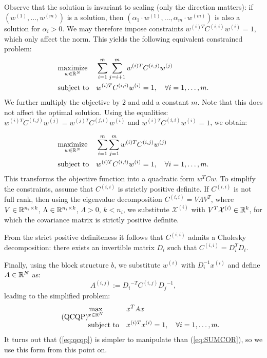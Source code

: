 Observe that the solution is invariant to scaling (only the direction matters):
if $\left(w^{(1)}, \ldots, w^{(m)}\right)$ is a solution, then
$\left(\alpha_1 \cdot w^{(1)}, \ldots, \alpha_m \cdot w^{(m)}\right)$ is also a
solution for $\alpha_i > 0$. We may therefore impose constraints $w^{(i)T}C^{(i,i)}w^{(i)} = 1$,
which only affect the norm. This yields the following  equivalent constrained problem:
\begin{equation}\label{eq:qcqp0}
\begin{aligned}
& \underset{w \in \mathbb{R}^N}{\text{maximize}}
& & \sum_{i = 1}^m \sum_{j = i+1}^m w^{(i)T} C^{(i,j)} w^{(j)}\\
& \text{subject to}
& &w^{(i)T} C^{(i,i)} w^{(i)} = 1, \quad\forall i = 1,\ldots, m.
\end{aligned}
\end{equation}
We further multiply the objective by $2$ and add a constant $m$. Note that this does not
affect the optimal solution. Using the equalities: $w^{(i)T} C^{(i,j)} w^{(j)} = w^{(j)T} C^{(j,i)} w^{(i)}$
and $w^{(i)T} C^{(i,i)} w^{(i)} = 1$, we obtain:

\begin{equation}\label{eq:qcqp05}
\begin{aligned}
& \underset{w \in \mathbb{R}^N}{\text{maximize}}
& & \sum_{i = 1}^m \sum_{j = 1}^m w^{(i)T} C^{(i,j)} w^{(j)}\\
& \text{subject to}
& &w^{(i)T} C^{(i,i)} w^{(i)} = 1, \quad\forall i = 1,\ldots, m.
\end{aligned}
\end{equation}
This transforms the objective function into a quadratic form $w^T C w$. To
simplify the constraints, assume that $C^{(i,i)}$ is strictly positive definite.
If $C^{(i,i)}$ is not full rank, then using the eigenvalue decomposition
$C^{(i,i)} = V \Lambda V^T$, where $V \in \mathbb{R}^{n_i \times k}$,
$\Lambda \in \mathbb{R}^{n_i \times k}$, $\Lambda > 0$, $k < n_i$,
we substitute $\mathcal{X}^{(i)}$ with $V^T \mathcal{X}^{(i)} \in \mathbb{R}^k$,
for which the covariance matrix is strictly positive definite.

From the strict positive definiteness it follows that $C^{(i,i)}$ admits a Cholesky
decomposition: there exists an invertible matrix $D_i$ such that $C^{(i,i)} = D_i^T D_i$.

Finally, using the block structure $b$, we substitute $w^{(i)}$
with $D_i^{-1} x^{(i)}$ and define $A \in \mathbb{R}^N$ as:
\begin{equation*}
A^{(i,j)} := {D_i}^{-T} C^{(i,j)} {D_j}^{-1},
\end{equation*}
leading to the simplified problem:
 \begin{equation}\label{eq:qcqp}
\tag{QCQP}
\begin{aligned}
& \underset{x \in \mathbb{R}^{N}}{\text{max}}
& & x^T A x\\
& \text{subject to}
& &x^{(i)T} x^{(i)} = 1, \quad\forall i = 1, \ldots, m.
\end{aligned}
\end{equation}
It turns out that (\ref{eq:qcqp}) is simpler to  manipulate than  (\ref{eq:SUMCOR}), so we use this form from this point on.

